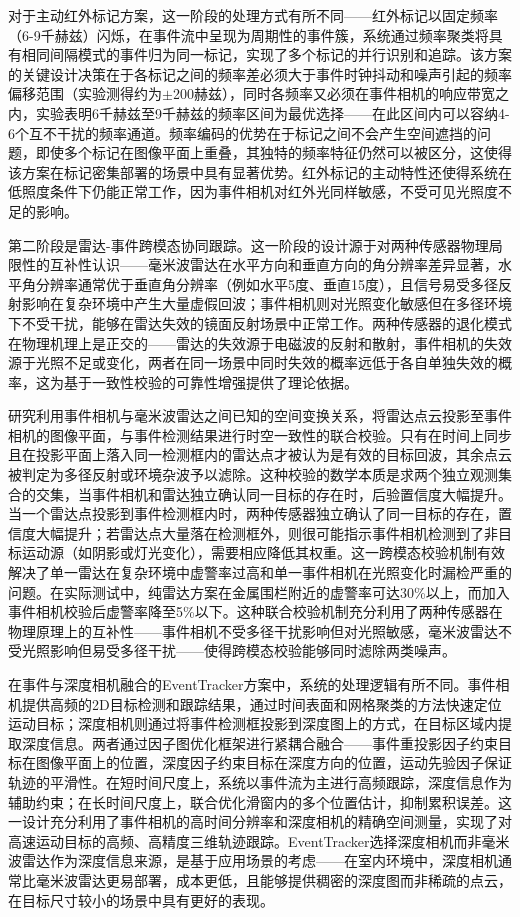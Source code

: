 对于主动红外标记方案，这一阶段的处理方式有所不同——红外标记以固定频率（6-9千赫兹）闪烁，在事件流中呈现为周期性的事件簇，系统通过频率聚类将具有相同间隔模式的事件归为同一标记，实现了多个标记的并行识别和追踪。该方案的关键设计决策在于各标记之间的频率差必须大于事件时钟抖动和噪声引起的频率偏移范围（实验测得约为$\pm$200赫兹），同时各频率又必须在事件相机的响应带宽之内，实验表明6千赫兹至9千赫兹的频率区间为最优选择——在此区间内可以容纳4-6个互不干扰的频率通道。频率编码的优势在于标记之间不会产生空间遮挡的问题，即使多个标记在图像平面上重叠，其独特的频率特征仍然可以被区分，这使得该方案在标记密集部署的场景中具有显著优势。红外标记的主动特性还使得系统在低照度条件下仍能正常工作，因为事件相机对红外光同样敏感，不受可见光照度不足的影响。

第二阶段是雷达-事件跨模态协同跟踪。这一阶段的设计源于对两种传感器物理局限性的互补性认识——毫米波雷达在水平方向和垂直方向的角分辨率差异显著，水平角分辨率通常优于垂直角分辨率（例如水平5度、垂直15度），且信号易受多径反射影响在复杂环境中产生大量虚假回波；事件相机则对光照变化敏感但在多径环境下不受干扰，能够在雷达失效的镜面反射场景中正常工作。两种传感器的退化模式在物理机理上是正交的——雷达的失效源于电磁波的反射和散射，事件相机的失效源于光照不足或变化，两者在同一场景中同时失效的概率远低于各自单独失效的概率，这为基于一致性校验的可靠性增强提供了理论依据。

研究利用事件相机与毫米波雷达之间已知的空间变换关系，将雷达点云投影至事件相机的图像平面，与事件检测结果进行时空一致性的联合校验。只有在时间上同步且在投影平面上落入同一检测框内的雷达点才被认为是有效的目标回波，其余点云被判定为多径反射或环境杂波予以滤除。这种校验的数学本质是求两个独立观测集合的交集，当事件相机和雷达独立确认同一目标的存在时，后验置信度大幅提升。当一个雷达点投影到事件检测框内时，两种传感器独立确认了同一目标的存在，置信度大幅提升；若雷达点大量落在检测框外，则很可能指示事件相机检测到了非目标运动源（如阴影或灯光变化），需要相应降低其权重。这一跨模态校验机制有效解决了单一雷达在复杂环境中虚警率过高和单一事件相机在光照变化时漏检严重的问题。在实际测试中，纯雷达方案在金属围栏附近的虚警率可达30\%以上，而加入事件相机校验后虚警率降至5\%以下。这种联合校验机制充分利用了两种传感器在物理原理上的互补性——事件相机不受多径干扰影响但对光照敏感，毫米波雷达不受光照影响但易受多径干扰——使得跨模态校验能够同时滤除两类噪声。

在事件与深度相机融合的EventTracker方案中，系统的处理逻辑有所不同。事件相机提供高频的2D目标检测和跟踪结果，通过时间表面和网格聚类的方法快速定位运动目标；深度相机则通过将事件检测框投影到深度图上的方式，在目标区域内提取深度信息。两者通过因子图优化框架进行紧耦合融合——事件重投影因子约束目标在图像平面上的位置，深度因子约束目标在深度方向的位置，运动先验因子保证轨迹的平滑性。在短时间尺度上，系统以事件流为主进行高频跟踪，深度信息作为辅助约束；在长时间尺度上，联合优化滑窗内的多个位置估计，抑制累积误差。这一设计充分利用了事件相机的高时间分辨率和深度相机的精确空间测量，实现了对高速运动目标的高频、高精度三维轨迹跟踪。EventTracker选择深度相机而非毫米波雷达作为深度信息来源，是基于应用场景的考虑——在室内环境中，深度相机通常比毫米波雷达更易部署，成本更低，且能够提供稠密的深度图而非稀疏的点云，在目标尺寸较小的场景中具有更好的表现。

